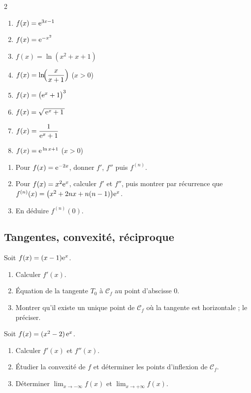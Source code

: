 \begin{multicols}{2}
\begin{enumerate}
	\item $f(x)=\mathrm{e}^{3x-1}$
	\item $f(x)=\mathrm{e}^{-x^{2}}$
	\item $f(x)=\ln(x^{2}+x+1)$
	\item $f(x)=\ln\!\Bigl(\dfrac{x}{x+1}\Bigr)$ \; ($x>0$)
	\item $f(x)=\bigl(\mathrm{e}^{x}+1\bigr)^{3}$
	\item $f(x)=\sqrt{\,\mathrm{e}^{x}+1\,}$
	\item $f(x)=\dfrac{1}{\mathrm{e}^{x}+1}$
	\item $f(x)=\mathrm{e}^{\,\ln x+1}$ \; ($x>0$)
\end{enumerate}
\end{multicols}

\begin{enumerate}
	\item Pour $f(x)=\mathrm{e}^{-2x}$, donner $f'$, $f''$ puis $f^{(n)}$.
	\item Pour $f(x)=x^{2}\mathrm{e}^{x}$, calculer $f'$ et $f''$, puis montrer par
	récurrence que $f^{(n)}(x)=\bigl(x^{2}+2nx+n(n-1)\bigr)\mathrm{e}^{x}$.
	\item En déduire $f^{(n)}(0)$.
\end{enumerate}

\subsection{Tangentes, convexité, réciproque}

Soit $f(x)=(x-1)\mathrm{e}^{x}$.
\begin{enumerate}
	\item Calculer $f'(x)$.
	\item Équation de la tangente $T_0$ à $\mathcal C_f$ au point d'abscisse $0$.
	\item Montrer qu'il existe un unique point de $\mathcal C_f$ où la tangente
	est horizontale ; le préciser.
\end{enumerate}

Soit $f(x)=(x^{2}-2)\,\mathrm{e}^{x}$.
\begin{enumerate}
	\item Calculer $f'(x)$ et $f''(x)$.
	\item Étudier la convexité de $f$ et déterminer les points d'inflexion
	de $\mathcal C_f$.
	\item Déterminer $\displaystyle\lim_{x\to-\infty}f(x)$ et
	$\displaystyle\lim_{x\to+\infty}f(x)$.
\end{enumerate}

